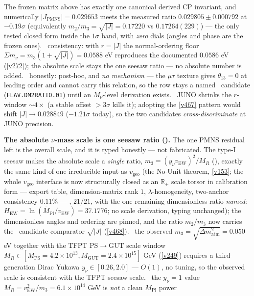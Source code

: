 \documentclass[11pt,a4paper]{article}
\newcommand{\Mpl}{M_{\mathrm{Pl}}}
\newcommand{\Mbar}{\bar M_{\mathrm{Pl}}}
\theoremstyle{definition}
\begin{document}
The frozen matrix above has exactly one canonical derived CP invariant, and numerically
$|J_{\mathrm{PMNS}}|=0.029653$ meets the measured ratio $0.029805\pm0.000792$ at $-0.19\sigma$ (equivalently
$m_2/m_3=\sqrt{|J|}=0.17220$ vs $0.17264(229)$) --- the only tested closed form inside the $1\sigma$ band, with
\emph{zero} dials (angles and phase are the frozen ones). \mC\ consistency: with $r=|J|$ the normal-ordering floor
$\Sigma m_\nu=m_3(1+\sqrt{|J|})=0.0588$ eV reproduces the documented $0.0586$ eV (\vref{v272}); the absolute scale
stays the one seesaw ratio --- no absolute number is added. \mO\ honestly: post-hoc, and \emph{no mechanism} --- the
$\mu\tau$ texture gives $\theta_{13}=0$ at leading order and cannot carry this relation, so the row stays a named
\mO\ candidate (\texttt{FLAV.DM2RATIO.01}) until an $M_\nu$-level derivation exists. \mX\ JUNO shrinks the
$r$-window ${\sim}4\times$ (a stable offset $>3\sigma$ kills it); adopting the \vref{v467} pattern would shift
$|J|\to0.028849$ ($-1.21\sigma$ today), so the two candidates \emph{cross-discriminate} at JUNO precision.
\par\smallskip\noindent\textbf{The absolute $\nu$-mass scale is one seesaw ratio ().}
The one PMNS residual left is the overall scale, and it is typed honestly --- not fabricated. The type-I seesaw
makes the absolute scale a \emph{single} ratio, $m_3=(y_\nu v_{\mathrm{EW}})^2/M_R$ (\mE), exactly the same kind of
one irreducible input as $v_{\mathrm{geo}}$ (the No-Unit theorem, \vref{v153}; the whole $v_{\mathrm{geo}}$
interface is now structurally closed as an $\mathbb R_+$ scale torsor in calibration form ---
export table, dimension-matrix rank $1$, $\lambda$-homogeneity, two-anchor consistency $0.11\%$ ---
, $21/21$, with the one remaining dimensionless ratio
\emph{named}: $H_{\mathrm{EW}}=\ln(\Mbar/v_{\mathrm{EW}})=37.1776$; no scale derivation, typing
unchanged); the dimensionless angles and ordering
are pinned, and the ratio $m_2/m_3$ now carries the \mO\ candidate comparator $\sqrt{|J|}$ (\vref{v468}). \mC\ the observed $m_3=\sqrt{\Delta m^2_{\mathrm{atm}}}
=0.050$ eV together with the TFPT PS$\to$GUT scale window $M_R\in[M_{\mathrm{PS}}{=}4.2{\times}10^{13},
M_{\mathrm{GUT}}{=}2.4{\times}10^{15}]$ GeV (\vref{v249}) requires a third-generation Dirac Yukawa
$y_\nu\in[0.26,2.0]$ --- $O(1)$, no tuning, so the observed scale is consistent with the TFPT seesaw scale.
\mO\ the $y_\nu{=}1$ value $M_R=v_{\mathrm{EW}}^2/m_3=6.1{\times}10^{14}$ GeV is \emph{not} a clean $\Mpl$ power
\end{document}
